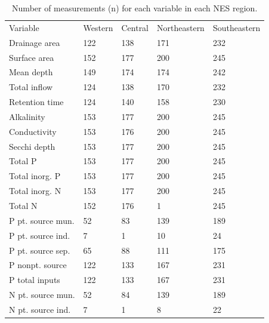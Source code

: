 \documentclass[journal abbreviations, manuscript]{copernicus}
\providecommand{\DIFaddbeginFL}{} %
\providecommand{\DIFaddendFL}{} %
\providecommand{\DIFdelbeginFL}{} %
\providecommand{\DIFdelendFL}{} %
\begin{document}
\begin{table}
\caption{Number of measurements (n) for each variable in each NES region.}\label{table:n}
\begin{tabular}{lllll}
\tophline
Variable & Western & Central & Northeastern & Southeastern\\
\middlehline
Drainage area & 122 & 138 & 171 & 232\\
\DIFdelbeginFL %
\DIFdelendFL \DIFaddbeginFL 

\DIFaddendFL Surface area & 152 & 177 & 200 & 245\\

Mean depth & 149 & 174 & 174 & 242\\

Total inflow & 124 & 138 & 170 & 232\\

Retention time & 124 & 140 & 158 & 230\\

Alkalinity & 153 & 177 & 200 & 245\\

Conductivity & 153 & 176 & 200 & 245\\

Secchi depth & 153 & 177 & 200 & 245\\

Total P & 153 & 177 & 200 & 245\\

Total inorg. P & 153 & 177 & 200 & 245\\

Total inorg. N & 153 & 177 & 200 & 245\\

Total N & 152 & 176 & 1 & 245\\

P pt. source mun. & 52 & 83 & 139 & 189\\

P pt. source ind. & 7 & 1 & 10 & 24\\

P pt. source sep. & 65 & 88 & 111 & 175\\

P nonpt. source & 122 & 133 & 167 & 231\\

P total inputs & 122 & 133 & 167 & 231\\

N pt. source mun. & 52 & 84 & 139 & 189\\

N pt. source ind. & 7 & 1 & 8 & 22\\


\end{tabular}
\end{table}
\end{document}

